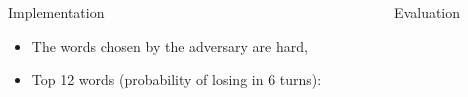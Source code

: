 \documentclass[final]{beamer}
\begin{document}
{\begin{frame}{}
\begin{center}
\begin{columns}[t]
\begin{column}{0.32\textwidth}
    \begin{block}{\huge Implementation}

\vspace{.5cm}
\begin{itemize}
\item The words chosen by the adversary are hard,
\item Top 12 words {\color{orange}(probability of losing in 6 turns)}:
\end{itemize}

    \end{block}


\end{column}

\begin{column}{0.32\textwidth}

       \begin{block}{\huge Evaluation}


\end{block}
\end{column}
\end{columns}
\end{center}
\end{frame}}
\end{document}
